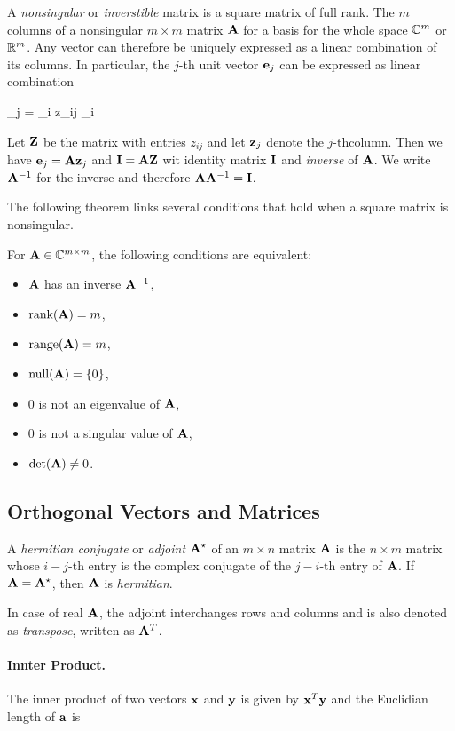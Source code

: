 A \emph{nonsingular} or \emph{inverstible} matrix is a square matrix of full rank. The $m$ columns of a nonsingular $m \times m$ matrix $\mathbf{A}$ for a basis for the whole space $\mathbb{C}^m$ or $\mathbb{R}^m$. Any vector can therefore be uniquely expressed as a linear combination of its columns. In particular, the $j$-th unit vector $\mathbf{e}_j$ can be expressed as linear combination

\bee
\ebf_j = \sum _i z_{ij} \abf_i
\eee

Let $\mathbf{Z}$ be the matrix with entries $z_{ij}$ and let $\mathbf{z}_j$ denote the $j$-thcolumn. Then we have $\mathbf{e}_j = \mathbf{A} \mathbf{z}_j$ and $\mathbf{I} = \mathbf{A} \mathbf{Z}$ wit identity matrix $\mathbf{I}$ and \emph{inverse} of $\mathbf{A}$. We write $\mathbf{A}^{-1}$ for the inverse and therefore $\mathbf{A} \mathbf{A}^{-1} = \mathbf{I}$.

The following theorem links several conditions that hold when a square matrix is nonsingular.

\begin{theorem}
  For $\mathbf{A} \in \mathbb{C}^{m \times m}$, the following conditions are equivalent:

  \begin{itemize}
  \item $\mathbf{A}$ has an inverse $\mathbf{A}^{-1}$,
  \item $\text{rank}(\mathbf{A}) = m$,
  \item $\text{range}(\mathbf{A}) = m$,
  \item $\text{null}(\mathbf{A}) = \{0\}$,
  \item $0$ is not an eigenvalue of $\mathbf{A}$,
  \item $0$ is not a singular value of $\mathbf{A}$,
  \item $\det(\mathbf{A}) \neq 0$.
\end{itemize}
\end{theorem}

\subsection{Orthogonal Vectors and Matrices}

A \emph{hermitian conjugate} or \emph{adjoint} $\mathbf{A}^\star$ of an $m \times n$ matrix $\mathbf{A}$ is the $n \times m$ matrix whose $i-j$-th entry is the complex conjugate of the $j-i$-th entry of $\mathbf{A}$. If $\mathbf{A} = \mathbf{A}^\star$, then $\mathbf{A}$ is \emph{hermitian}.

In case of real $\mathbf{A}$, the adjoint interchanges rows and columns and is also denoted as \emph{transpose}, written as $\mathbf{A}^T$. 

\paragraph{Innter Product.} The inner product of two vectors $\mathbf{x}$ and $\mathbf{y}$ is given by $\mathbf{x}^T \mathbf{y}$ and the Euclidian length of $\mathbf{a}$ is

